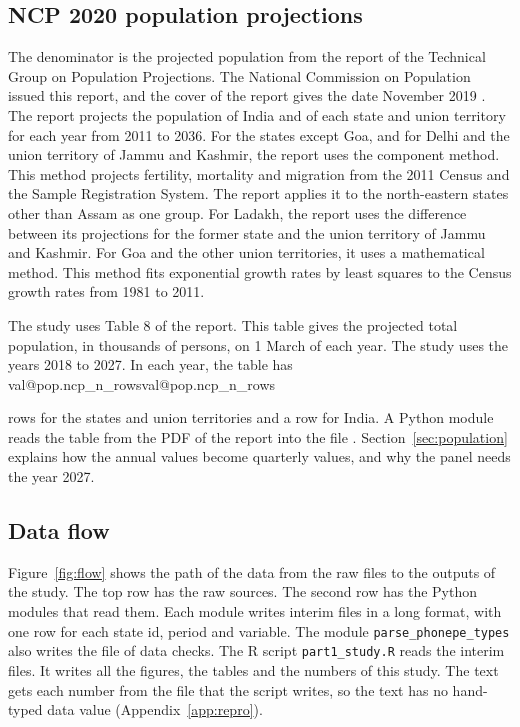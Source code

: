 \documentclass[11pt,a4paper]{article}
\makeatletter
\newcommand{\val}[1]{\ifcsname val@#1\endcsname\csname val@#1\endcsname\else
  \PackageError{study}{Unknown value key `#1'}{Run Rscript src/R/part1_study.R}\fi}
\makeatother
\begin{document}
\subsection{NCP 2020 population projections}
The denominator is the projected population from the report of the Technical Group on Population Projections. The National Commission on Population issued this report, and the cover of the report gives the date November 2019 \citep{ncp2020}. The report projects the population of India and of each state and union territory for each year from 2011 to 2036. For the states except Goa, and for Delhi and the union territory of Jammu and Kashmir, the report uses the component method. This method projects fertility, mortality and migration from the 2011 Census and the Sample Registration System. The report applies it to the north-eastern states other than Assam as one group. For Ladakh, the report uses the difference between its projections for the former state and the union territory of Jammu and Kashmir. For Goa and the other union territories, it uses a mathematical method. This method fits exponential growth rates by least squares to the Census growth rates from 1981 to 2011.

The study uses Table 8 of the report. This table gives the projected total population, in thousands of persons, on 1 March of each year. The study uses the years 2018 to 2027. In each year, the table has \val{pop.ncp_n_rows} rows for the states and union territories and a row for India. A Python module reads the table from the PDF of the report into the file . Section~\ref{sec:population} explains how the annual values become quarterly values, and why the panel needs the year 2027.

\subsection{Data flow}
Figure~\ref{fig:flow} shows the path of the data from the raw files to the outputs of the study. The top row has the raw sources. The second row has the Python modules that read them. Each module writes interim files in a long format, with one row for each state id, period and variable. The module \texttt{parse\_phonepe\_types} also writes the file of data checks. The R script \texttt{part1\_study.R} reads the interim files. It writes all the figures, the tables and the numbers of this study. The text gets each number from the file  that the script writes, so the text has no hand-typed data value (Appendix~\ref{app:repro}).
\end{document}
